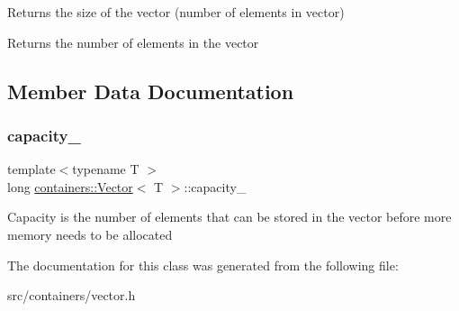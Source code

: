 Returns the size of the vector (number of elements in vector)

\begin{DoxyReturn}{Returns}
the number of elements in the vector 
\end{DoxyReturn}


\subsection{Member Data Documentation}
\mbox{\label{classcontainers_1_1_vector_a96dab5062859bbed7a88930c7df5d33f}} 
\subsubsection{\texorpdfstring{capacity\+\_\+}{capacity\_}}
{\footnotesize\ttfamily template$<$typename T $>$ \\
long \hyperlink{classcontainers_1_1_vector}{containers\+::\+Vector}$<$ T $>$\+::capacity\+\_\+\hspace{0.3cm}{\ttfamily [private]}}

Capacity is the number of elements that can be stored in the vector before more memory needs to be allocated 

The documentation for this class was generated from the following file\+:\begin{DoxyCompactItemize}
\item 
src/containers/vector.\+h\end{DoxyCompactItemize}
